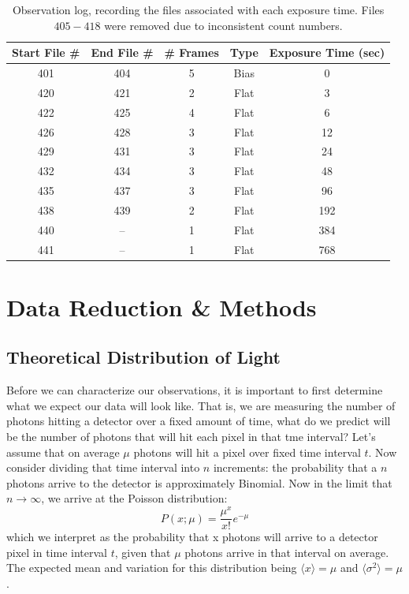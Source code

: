 \documentclass[preprint]{aastex62}
\begin{document}
\begin{table}[H]
\centering
\begin{tabular}{|c|c|c|c|c|}
    \hline
    Start File \# & End File \# & \# Frames & Type  & Exposure Time (sec) \\
    \hline
    \hline
    401 & 404 & 5 & Bias & 0  \\
    420 & 421 & 2 & Flat & 3 \\
    422 & 425 & 4 & Flat & 6 \\
    426 & 428 & 3 & Flat & 12 \\
    429 & 431 & 3 & Flat & 24 \\
    432 & 434 & 3 & Flat & 48 \\
    435 & 437 & 3 & Flat & 96 \\
    438 & 439 & 2 & Flat & 192 \\
    440 & --  & 1 & Flat & 384 \\
    441 & --  & 1 & Flat & 768 \\
    \hline
\end{tabular}
\caption{Observation log, recording the files associated with each exposure time. Files $405-418$ were removed due to inconsistent count numbers.} \label{table:log}
\end{table}


\section{Data Reduction \& Methods}
\subsection{Theoretical Distribution of Light} \label{subsec:distributions}
Before we can characterize our observations, it is important to first determine what we expect our data will look like. That is, we are measuring the number of photons hitting a detector over a fixed amount of time, what do we predict will be the number of photons that will hit each pixel in that tme interval? Let's assume that on average $\mu$ photons will hit a pixel over fixed time interval $t$. Now consider dividing that time interval into $n$ increments: the probability that a $n$ photons arrive to the detector is approximately Binomial. Now in the limit that $n\rightarrow\infty$, we arrive at the Poisson distribution:
\begin{equation}
P(x;\mu) = \frac{\mu^x}{x!}e^{-\mu}
\end{equation}
which we interpret as the probability that x photons will arrive to a detector pixel in time interval $t$, given that $\mu$ photons arrive in that interval on average. The expected mean and variation for this distribution being $\langle x \rangle = \mu$ and $\langle \sigma^2 \rangle = \mu$. 
\end{document}
